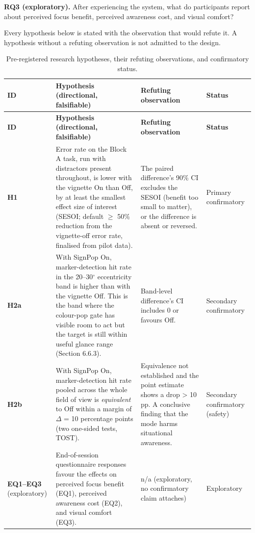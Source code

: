\textbf{RQ3 (exploratory).} After experiencing the system, what do participants report about perceived
focus benefit, perceived awareness cost, and visual comfort?

Every hypothesis below is stated with the observation that would refute it. A hypothesis without a
refuting observation is not admitted to the design.

\begin{longtable}{p{}|p{}|p{}|p{}}
\caption{Pre-registered research hypotheses, their refuting observations, and confirmatory status.}\\
\hline
\textbf{ID} & \textbf{Hypothesis (directional, falsifiable)} & \textbf{Refuting observation} & \textbf{Status} \\
\hline
\endfirsthead
\hline
\textbf{ID} & \textbf{Hypothesis (directional, falsifiable)} & \textbf{Refuting observation} & \textbf{Status} \\
\hline
\endhead
\hline
\textbf{H1} & Error rate on the Block A task, run with distractors present throughout, is lower with the vignette On than Off, by at least the smallest effect size of interest (SESOI; default $\geq$ 50\% reduction from the vignette-off error rate, finalised from pilot data). & The paired difference's 90\% CI excludes the SESOI (benefit too small to matter), or the difference is absent or reversed. & Primary confirmatory \\
\textbf{H2a} & With SignPop On, marker-detection hit rate in the 20–30$^{\circ}$ eccentricity band is higher than with the vignette Off. This is the band where the colour-pop gate has visible room to act but the target is still within useful glance range (Section 6.6.3). & Band-level difference's CI includes 0 or favours Off. & Secondary confirmatory \\
\textbf{H2b} & With SignPop On, marker-detection hit rate pooled across the whole field of view is \textit{equivalent} to Off within a margin of $\Delta$ = 10 percentage points (two one-sided tests, TOST). & Equivalence not established and the point estimate shows a drop > 10 pp. A conclusive finding that the mode harms situational awareness. & Secondary confirmatory (safety) \\
\textbf{EQ1–EQ3} (exploratory) & End-of-session questionnaire responses favour the effects on perceived focus benefit (EQ1), perceived awareness cost (EQ2), and visual comfort (EQ3). & n/a (exploratory, no confirmatory claim attaches) & Exploratory \\
\hline
\end{longtable}

